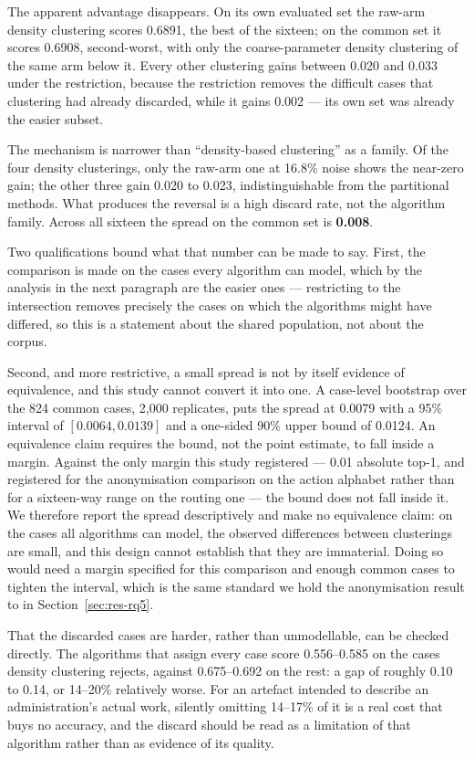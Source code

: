 The apparent advantage disappears. On its own evaluated set the raw-arm density clustering
scores 0.6891, the best of the sixteen; on the common set it scores 0.6908, second-worst, with
only the coarse-parameter density clustering of the same arm below it. Every other clustering
gains between 0.020 and 0.033 under the restriction, because the restriction removes the
difficult cases that clustering had already discarded, while it gains 0.002 --- its own set was
already the easier subset.

The mechanism is narrower than ``density-based clustering'' as a family. Of the four density
clusterings, only the raw-arm one at 16.8\% noise shows the near-zero gain; the other three gain
0.020 to 0.023, indistinguishable from the partitional methods. What produces the reversal is a
high discard rate, not the algorithm family. Across all sixteen the spread on the common set is \textbf{0.008}.

Two qualifications bound what that number can be made to say. First, the comparison is made on
the cases every algorithm can model, which by the analysis in the next paragraph are the easier
ones --- restricting to the intersection removes precisely the cases on which the algorithms
might have differed, so this is a statement about the shared population, not about the corpus.

Second, and more restrictive, a small spread is not by itself evidence of equivalence, and this
study cannot convert it into one. A case-level bootstrap over the 824 common cases, 2{,}000
replicates, puts the spread at 0.0079 with a 95\% interval of $[0.0064, 0.0139]$ and a one-sided
90\% upper bound of 0.0124. An equivalence claim requires the bound, not the point estimate, to
fall inside a margin. Against the only margin this study registered --- 0.01 absolute top-1, and
registered for the anonymisation comparison on the action alphabet rather than for a sixteen-way
range on the routing one --- the bound does not fall inside it. We therefore report the spread
descriptively and make no equivalence claim: on the cases all algorithms can model, the observed
differences between clusterings are small, and this design cannot establish that they are
immaterial. Doing so would need a margin specified for this comparison and enough common cases
to tighten the interval, which is the same standard we hold the anonymisation result to in
Section~\ref{sec:res-rq5}.

That the discarded cases are harder, rather than unmodellable, can be checked directly. The
algorithms that assign every case score 0.556--0.585 on the cases density clustering rejects,
against 0.675--0.692 on the rest: a gap of roughly 0.10 to 0.14, or 14--20\% relatively worse.
For an artefact intended to describe an administration's actual work, silently omitting 14--17\%
of it is a real cost that buys no accuracy, and the discard should be read as a limitation of
that algorithm rather than as evidence of its quality.

